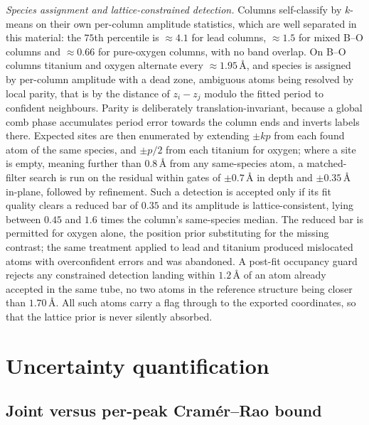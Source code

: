 \documentclass[aps,prb,twocolumn,superscriptaddress,floatfix,nofootinbib]{revtex4-2}
\begin{document}
\emph{Species assignment and lattice-constrained detection.} Columns self-classify by $k$-means
on their own per-column amplitude statistics, which are well separated in this material: the
$75$th percentile is $\approx4.1$ for lead columns, $\approx1.5$ for mixed B--O columns and
$\approx0.66$ for pure-oxygen columns, with no band overlap. On B--O columns titanium and oxygen
alternate every $\approx1.95$\,\AA, and species is assigned by per-column amplitude with a dead
zone, ambiguous atoms being resolved by local parity, that is by the distance of $z_i-z_j$
modulo the fitted period to confident neighbours. Parity is deliberately translation-invariant,
because a global comb phase accumulates period error towards the column ends and inverts labels
there. Expected sites are then enumerated by extending $\pm kp$ from each found atom of the same
species, and $\pm p/2$ from each titanium for oxygen; where a site is empty, meaning further
than $0.8$\,\AA{} from any same-species atom, a matched-filter search is run on the residual
within gates of $\pm0.7$\,\AA{} in depth and $\pm0.35$\,\AA{} in-plane, followed by refinement.
Such a detection is accepted only if its fit quality clears a reduced bar of $0.35$ and its
amplitude is lattice-consistent, lying between $0.45$ and $1.6$ times the column's same-species
median. The reduced bar is permitted for oxygen alone, the position prior substituting for the
missing contrast; the same treatment applied to lead and titanium produced mislocated atoms
with overconfident errors and was abandoned. A post-fit occupancy guard rejects any constrained
detection landing within $1.2$\,\AA{} of an atom already accepted in the same tube, no two atoms
in the reference structure being closer than $1.70$\,\AA. All such atoms carry a flag through to
the exported coordinates, so that the lattice prior is never silently absorbed.

\section{Uncertainty quantification}
\label{app:uq}
\setcounter{table}{0}
\setcounter{figure}{0}

\subsection{Joint versus per-peak Cram\'er--Rao bound}
\end{document}
